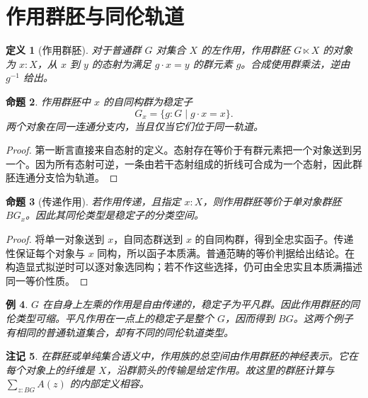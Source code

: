\documentclass[12pt,oneside,openany,fontset=none]{ctexbook}
\theoremstyle{cn}
\newtheorem{definition}{定义}[chapter]
\newtheorem{example}[definition]{例}
\newtheorem{proposition}[definition]{命题}
\newtheorem{remark}[definition]{注记}
\numberwithin{equation}{chapter}
\begin{document}
\section{作用群胚与同伦轨道}
\begin{definition}[作用群胚]
对于普通群 $G$ 对集合 $X$ 的左作用，作用群胚 $G\ltimes X$ 的对象为 $x:X$，从 $x$ 到 $y$ 的态射为满足 $g\cdot x=y$ 的群元素 $g$。合成使用群乘法，逆由 $g^{-1}$ 给出。
\end{definition}
\begin{proposition}
作用群胚中 $x$ 的自同构群为稳定子
\[
G_x=\{g:G\mid g\cdot x=x\}.
\]
两个对象在同一连通分支内，当且仅当它们位于同一轨道。
\end{proposition}
\begin{proof}
第一断言直接来自态射的定义。态射存在等价于有群元素把一个对象送到另一个。因为所有态射可逆，一条由若干态射组成的折线可合成为一个态射，因此群胚连通分支恰为轨道。
\end{proof}
\begin{proposition}[传递作用]
若作用传递，且指定 $x:X$，则作用群胚等价于单对象群胚 $BG_x$。因此其同伦类型是稳定子的分类空间。
\end{proposition}
\begin{proof}
将单一对象送到 $x$，自同态群送到 $x$ 的自同构群，得到全忠实函子。传递性保证每个对象与 $x$ 同构，所以函子本质满。普通范畴的等价判据给出结论。在构造显式拟逆时可以逐对象选同构；若不作这些选择，仍可由全忠实且本质满描述同一等价性质。
\end{proof}
\begin{example}
$G$ 在自身上左乘的作用是自由传递的，稳定子为平凡群。因此作用群胚的同伦类型可缩。平凡作用在一点上的稳定子是整个 $G$，因而得到 $BG$。这两个例子有相同的普通轨道集合，却有不同的同伦轨道类型。
\end{example}
\begin{remark}
在群胚或单纯集合语义中，作用族的总空间由作用群胚的神经表示。它在每个对象上的纤维是 $X$，沿群箭头的传输是给定作用。故这里的群胚计算与 $\sum_{z:BG}A(z)$ 的内部定义相容。
\end{remark}
\end{document}
